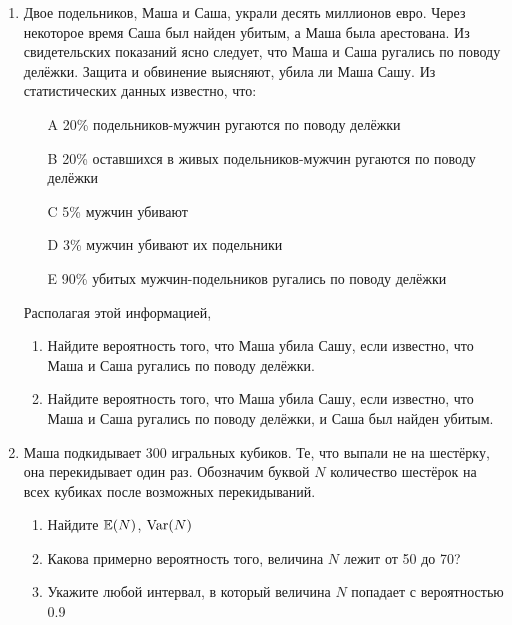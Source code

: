 \documentclass[12pt, a4paper]{article}\usepackage[]{graphicx}\usepackage[]{color}
\begin{document}
\begin{enumerate}
\item Двое подельников, Маша и Саша, украли десять миллионов евро. Через некоторое время Саша был найден убитым, а Маша была арестована. Из свидетельских показаний ясно следует, что Маша и Саша ругались по поводу делёжки. Защита и обвинение выясняют, убила ли Маша Сашу. Из статистических данных известно, что:
\begin{enumerate}
\item[A] 20\% подельников-мужчин ругаются по поводу делёжки
\item[B] 20\% оставшихся в живых подельников-мужчин ругаются по поводу делёжки
\item[C] 5\% мужчин убивают
\item[D] 3\% мужчин убивают их подельники
\item[E] 90\% убитых мужчин-подельников ругались по поводу делёжки
\end{enumerate}
Располагая этой информацией,
\begin{enumerate}
\item Найдите вероятность того, что Маша убила Сашу, если известно, что Маша и Саша ругались по поводу делёжки.
\item Найдите вероятность того, что Маша убила Сашу, если известно, что Маша и Саша ругались по поводу делёжки, и Саша был найден убитым.
\end{enumerate}


\item Маша подкидывает 300 игральных кубиков. Те, что выпали не на шестёрку, она перекидывает один раз. Обозначим буквой $N$ количество шестёрок на всех кубиках после возможных перекидываний.
\begin{enumerate}
\item Найдите $\mathbb{E}(N)$, $\operatorname{Var}(N)$
\item Какова примерно вероятность того, величина $N$ лежит от 50 до 70?
\item Укажите любой интервал, в который величина $N$ попадает с вероятностью 0.9
\end{enumerate}


\end{enumerate}
\end{document}
